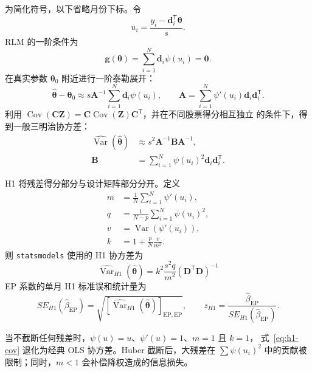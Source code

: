 \documentclass[UTF8,a4paper,11pt]{ctexart}
\begin{document}
为简化符号，以下省略月份下标。令
\begin{equation}
  u_i=\frac{y_i-\bm{d}_i^{\mathsf T}\bm{\theta}}{s}.
\end{equation}
RLM 的一阶条件为
\begin{equation}
  \bm{g}(\bm{\theta})
  =\sum_{i=1}^{N}\bm{d}_i\psi(u_i)=\bm{0}.
\end{equation}
在真实参数 $\bm{\theta}_0$ 附近进行一阶泰勒展开：
\begin{equation}
  \widehat{\bm{\theta}}-\bm{\theta}_0
  \approx
  s\bm{A}^{-1}
  \sum_{i=1}^{N}\bm{d}_i\psi(u_i),
  \qquad
  \bm{A}=\sum_{i=1}^{N}\psi'(u_i)\bm{d}_i\bm{d}_i^{\mathsf T}.
\end{equation}
利用 $\operatorname{Cov}(\bm{C}\bm{Z})
=\bm{C}\operatorname{Cov}(\bm{Z})\bm{C}^{\mathsf T}$，并在不同股票得分相互独立
的条件下，得到一般三明治协方差：
\begin{align}
  \widehat{\operatorname{Var}}(\widehat{\bm{\theta}})
  &\approx s^2\bm{A}^{-1}\bm{B}\bm{A}^{-1},\\
  \bm{B}
  &=\sum_{i=1}^{N}\psi(u_i)^2\bm{d}_i\bm{d}_i^{\mathsf T}.
\end{align}

H1 将残差得分部分与设计矩阵部分分开。定义
\begin{align}
  m&=\frac{1}{N}\sum_{i=1}^{N}\psi'(u_i),\\
  q&=\frac{1}{N-p}\sum_{i=1}^{N}\psi(u_i)^2,\\
  v&=\operatorname{Var}\!\left(\psi'(u_i)\right),\\
  k&=1+\frac{p}{N}\frac{v}{m^2}.
\end{align}
则 \texttt{statsmodels} 使用的 H1 协方差为
\begin{equation}
  \boxed{
  \widehat{\operatorname{Var}}_{H1}(\widehat{\bm{\theta}})
  =k^2\frac{s^2q}{m^2}
   (\bm{D}^{\mathsf T}\bm{D})^{-1}}
  \label{eq:h1-cov}
\end{equation}
EP 系数的单月 H1 标准误和统计量为
\begin{equation}
  SE_{H1}(\widehat\beta_{\mathrm{EP}})
  =\sqrt{\left[
  \widehat{\operatorname{Var}}_{H1}(\widehat{\bm{\theta}})
  \right]_{\mathrm{EP},\mathrm{EP}}},
  \qquad
  z_{H1}=\frac{\widehat\beta_{\mathrm{EP}}}
  {SE_{H1}(\widehat\beta_{\mathrm{EP}})}.
\end{equation}

当不截断任何残差时，$\psi(u)=u$、$\psi'(u)=1$、$m=1$ 且 $k=1$，
式~\eqref{eq:h1-cov} 退化为经典 OLS 协方差。Huber 截断后，大残差在
$\sum\psi(u_i)^2$ 中的贡献被限制；同时，$m<1$ 会补偿降权造成的信息损失。
\end{document}
